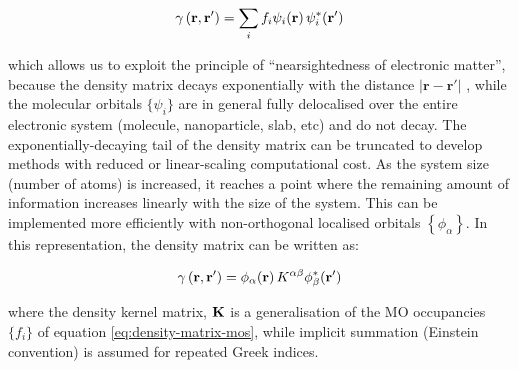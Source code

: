\documentclass[../main.tex]{subfiles}
\begin{document}
\begin{equation}
    \gamma\left(\mathbf{r},\mathbf{r'}\right)=\sum\limits_i f_i \psi_i\!\left(\mathbf{r}\right)\psi_i^*\!\left(\mathbf{r'}\right) \label{eq:density-matrix-mos}
\end{equation}

which allows us to exploit the principle of ``nearsightedness of electronic matter'',\cite{Prodans2005} because the density matrix decays exponentially with the distance $|\mathbf{r}-\mathbf{r'}|$ \cite{Prodans2005}, while the molecular orbitals $\{ \psi_{i} \}$ are in general fully delocalised over the entire electronic system (molecule, nanoparticle, slab, etc) and do not decay. 
The exponentially-decaying tail of the density matrix can be truncated to develop methods with reduced or linear-scaling computational cost. As the system size (number of atoms) is increased, it reaches a point where the remaining amount of information increases linearly with the size of the system. This can be implemented more efficiently with non-orthogonal localised orbitals $\left\{\phi_\alpha\right\}$.\cite{Galli1992, hernandez1995} In this representation, the density matrix can be written as:

\begin{equation}
    \gamma\left(\mathbf{r},\mathbf{r'}\right)=\phi_\alpha\!\left(\mathbf{r}\right) K^{\alpha\beta} \phi_\beta^*\!\left(\mathbf{r'}\right) 
\end{equation}

where the density kernel matrix, $\bf K$ is a generalisation of the MO occupancies $\{ f_i \} $ of equation \ref{eq:density-matrix-mos}, while implicit summation (Einstein convention) is assumed for repeated Greek indices. 
\end{document}
